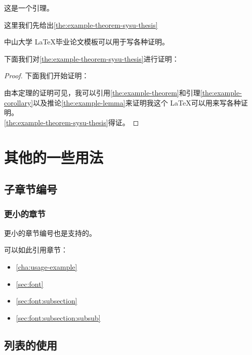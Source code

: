 \begin{lemma}[引理例子]
	\label{the:example-lemma}
	这是一个引理。
\end{lemma}

这里我们先给出\autoref{the:example-theorem-sysu-thesis}

\begin{theorem}[中山大学毕业论文模板定理]
\label{the:example-theorem-sysu-thesis}
中山大学 \LaTeX 毕业论文模板\cite{sysu-thesis}可以用于写各种证明。
\end{theorem}

下面我们对\autoref{the:example-theorem-sysu-thesis}进行证明：


\begin{proof}

下面我们开始证明：

由本定理的证明可见，我可以引用\autoref{the:example-theorem}和引理\ref{the:example-corollary}以及推论\ref{the:example-lemma}来证明我这个 \LaTeX 可以用来写各种证明。 \\

\autoref{the:example-theorem-sysu-thesis}得证。
\end{proof}



\section{其他的一些用法}
\label{sec:font}
\subsection{子章节编号}
\label{sec:font:subsection}
\subsubsection{更小的章节}
\label{sec:font:subsection:subsub}
更小的章节编号也是支持的。

可以如此引用章节：

\begin{itemize}
	\item \autoref{cha:usage-example}
	\item  \autoref{sec:font}
	\item  \autoref{sec:font:subsection}
	\item  \autoref{sec:font:subsection:subsub}
\end{itemize}


\subsection{列表的使用}
\label{sec:font:list}

